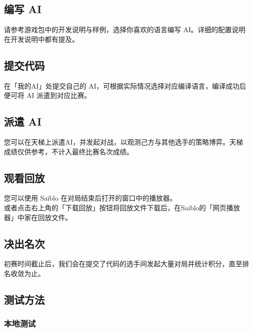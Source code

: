 \documentclass[UTF8]{article}
\begin{document}
\hypertarget{header-n39}{%
\subsection{编写 AI}\label{header-n39}}

请参考游戏包中的开发说明与样例，选择你喜欢的语言编写
AI。详细的配置说明在开发说明中都有提及。

\hypertarget{header-n41}{%
\subsection{提交代码}\label{header-n41}}

在「我的AI」处提交自己的
AI，可根据实际情况选择对应编译语言，编译成功后便可将 AI 派遣到对应比赛。

\hypertarget{header-n43}{%
\subsection{派遣 AI}\label{header-n43}}

您可以在天梯上派遣AI，并发起对战，以观测己方与其他选手的策略博弈。天梯成绩仅供参考，不计入最终比赛名次成绩。

\hypertarget{header-n45}{%
\subsection{观看回放}\label{header-n45}}

您可以使用 Saiblo 在对局结束后打开的窗口中的播放器。\\
或者点击右上角的「下载回放」按钮将回放文件下载后，在Saiblo的「网页播放器」中家在回放文件。

\hypertarget{header-n47}{%
\subsection{决出名次}\label{header-n47}}

初赛时间截止后，我们会在提交了代码的选手间发起大量对局并统计积分，直至排名收敛为止。

\hypertarget{header-n49}{%
\subsection{测试方法}\label{header-n49}}

\hypertarget{header-n50}{%
\subsubsection{本地测试}\label{header-n50}}
\end{document}
